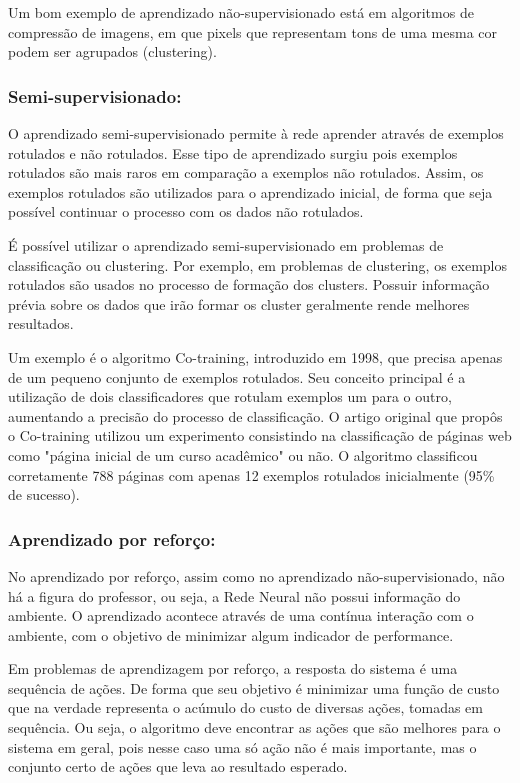 \documentclass[11pt]{article}
\begin{document}
Um bom exemplo de aprendizado não-supervisionado está em algoritmos de
compressão de imagens, em que pixels que representam tons de uma mesma
cor podem ser agrupados (clustering).

\subsubsection{Semi-supervisionado:}\label{semi-supervisionado}

O aprendizado semi-supervisionado permite à rede aprender através de
exemplos rotulados e não rotulados. Esse tipo de aprendizado surgiu pois
exemplos rotulados são mais raros em comparação a exemplos não
rotulados. Assim, os exemplos rotulados são utilizados para o
aprendizado inicial, de forma que seja possível continuar o processo com
os dados não rotulados.

É possível utilizar o aprendizado semi-supervisionado em problemas de
classificação ou clustering. Por exemplo, em problemas de clustering, os
exemplos rotulados são usados no processo de formação dos clusters.
Possuir informação prévia sobre os dados que irão formar os cluster
geralmente rende melhores resultados.

Um exemplo é o algoritmo Co-training, introduzido em 1998, que precisa
apenas de um pequeno conjunto de exemplos rotulados. Seu conceito
principal é a utilização de dois classificadores que rotulam exemplos um
para o outro, aumentando a precisão do processo de classificação. O
artigo original que propôs o Co-training utilizou um experimento
consistindo na classificação de páginas web como "página inicial de um
curso acadêmico" ou não. O algoritmo classificou corretamente 788
páginas com apenas 12 exemplos rotulados inicialmente (95\% de sucesso).

\subsubsection{Aprendizado por
reforço:}\label{aprendizado-por-reforuxe7o}

No aprendizado por reforço, assim como no aprendizado
não-supervisionado, não há a figura do professor, ou seja, a Rede Neural
não possui informação do ambiente. O aprendizado acontece através de uma
contínua interação com o ambiente, com o objetivo de minimizar algum
indicador de performance.

Em problemas de aprendizagem por reforço, a resposta do sistema é uma
sequência de ações. De forma que seu objetivo é minimizar uma função de
custo que na verdade representa o acúmulo do custo de diversas ações,
tomadas em sequência. Ou seja, o algoritmo deve encontrar as ações que
são melhores para o sistema em geral, pois nesse caso uma só ação não é
mais importante, mas o conjunto certo de ações que leva ao resultado
esperado.
\end{document}
